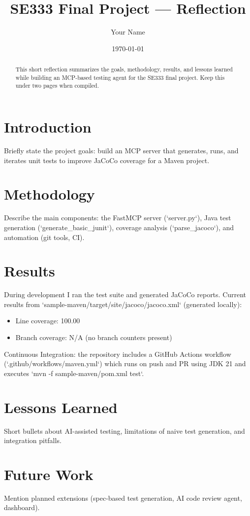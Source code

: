 \documentclass[11pt]{article}
\title{SE333 Final Project — Reflection}
\author{Your Name}
\date{\today}
\begin{document}
\maketitle
\begin{abstract}
This short reflection summarizes the goals, methodology, results, and lessons learned while building an MCP-based testing agent for the SE333 final project. Keep this under two pages when compiled.
\end{abstract}

\section{Introduction}
Briefly state the project goals: build an MCP server that generates, runs, and iterates unit tests to improve JaCoCo coverage for a Maven project.

\section{Methodology}
Describe the main components: the FastMCP server (`server.py`), Java test generation (`generate_basic_junit`), coverage analysis (`parse_jacoco`), and automation (git tools, CI).

\section{Results}
During development I ran the test suite and generated JaCoCo reports. Current results from `sample-maven/target/site/jacoco/jacoco.xml` (generated locally):

\begin{itemize}
  \item Line coverage: 100.00%
  \item Branch coverage: N/A (no branch counters present)
\end{itemize}

Continuous Integration: the repository includes a GitHub Actions workflow (`.github/workflows/maven.yml`) which runs on push and PR using JDK 21 and executes `mvn -f sample-maven/pom.xml test`.

\section{Lessons Learned}
Short bullets about AI-assisted testing, limitations of naive test generation, and integration pitfalls.

\section{Future Work}
Mention planned extensions (spec-based test generation, AI code review agent, dashboard).
\end{document}
